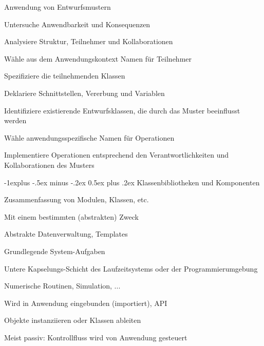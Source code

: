 \documentclass[a4paper]{article}
\makeatletter
\renewcommand{\subsection}{\@startsection{subsection}{2}{0mm}%
                                {-1explus -.5ex minus -.2ex}%
                                {0.5ex plus .2ex}%
                                {\normalfont\normalsize\bfseries}}
\makeatother
\begin{document}
\begin{multicols}{3}
  Anwendung von Entwurfsmustern
  \begin{itemize*}
    \item Untersuche Anwendbarkeit und Konsequenzen
    \item Analysiere Struktur, Teilnehmer und Kollaborationen
    \item Wähle aus dem Anwendungskontext Namen für Teilnehmer
    \item Spezifiziere die teilnehmenden Klassen
    \begin{itemize*}
      \item Deklariere Schnittstellen, Vererbung und Variablen
      \item Identifiziere existierende Entwurfsklassen, die durch das Muster beeinflusst werden
    \end{itemize*}
    \item Wähle anwendungsspezifische Namen für Operationen
    \item Implementiere Operationen entsprechend den Verantwortlichkeiten und Kollaborationen des Musters
  \end{itemize*}

  \subsection{Klassenbibliotheken und Komponenten}
  \begin{itemize*}
    \item Zusammenfassung von Modulen, Klassen, etc.
    \item Mit einem bestimmten (abstrakten) Zweck
    \begin{itemize*}
      \item Abstrakte Datenverwaltung, Templates
      \item Grundlegende System-Aufgaben
      \item Untere Kapselungs-Schicht des Laufzeitsystems oder der Programmierumgebung
      \item Numerische Routinen, Simulation, ...
    \end{itemize*}
    \item Wird in Anwendung eingebunden (importiert), API
    \item Objekte instanziieren oder Klassen ableiten
    \item Meist passiv: Kontrollfluss wird von Anwendung gesteuert
  \end{itemize*}


\end{multicols}
\end{document}
